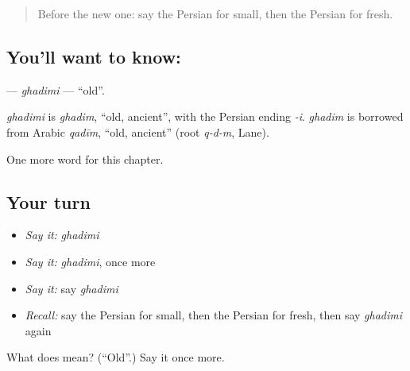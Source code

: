 \begin{quote}
Before the new one: say the Persian for small, then the Persian for fresh.
\end{quote}

\subsection*{You'll want to know: }
\textbf{} — \emph{ghadimi} — \textquotedblleft{}old\textquotedblright{}.

\begin{cousinweb}
\emph{ghadimi} is \emph{ghadim}, \textquotedblleft{}old, ancient\textquotedblright{}, with the Persian ending \emph{-i}. \emph{ghadim} is borrowed from Arabic \emph{qadīm}, \textquotedblleft{}old, ancient\textquotedblright{} (root \emph{q-d-m}, Lane).
\end{cousinweb}

\begin{grammarlens}[title={What you've built}]
One more word for this chapter.
\end{grammarlens}

\subsection*{Your turn}
\begin{itemize}
\raggedright
  \item \emph{Say it:} \emph{ghadimi}
  \item \emph{Say it:} \emph{ghadimi}, once more
  \item \emph{Say it:} say \emph{ghadimi}
  \item \emph{Recall:} say the Persian for small, then the Persian for fresh, then say \emph{ghadimi} again
\end{itemize}

\begin{tcolorbox}[breakable,colback=teal!4,colframe=teal!35!black,title={Before you move on}]
What does  mean? (\textquotedblleft{}Old\textquotedblright{}.) Say it once more.
\end{tcolorbox}
